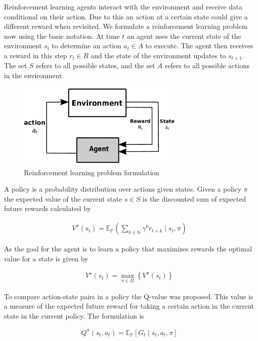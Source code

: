 \documentclass[a4paper]{article}
\begin{document}
Reinforcement learning agents interact with the environment and receive data conditional on their action. Due to this an action at a certain state could give a different reward when revisited. We formulate a reinforcement learning problem now using the basic notation. At time $t$ an agent uses the current state of the environment $s_t$ to determine an action $a_t \in A$ to execute. The agent then receives a reward in this step $r_t \in R$ and the state of the environment updates to $s_{t+1}$. The set $S$ refers to all possible states, and the set $A$ refers to all possible actions in the environment.

\begin{figure}[hbt!]
	\centering
	\includegraphics[width=8cm]{rl_example.png}
	\caption{Reinforcement learning problem formulation}
\end{figure}

\FloatBarrier

A policy is a probability distribution over actions given states. Given a policy $\pi$ the expected value of the current state $s \in S$ is the discounted sum of expected future rewards calculated by

\begin{align*}
	V^{\pi}\left(s_{t}\right)=\mathbb{E}_{\mathbb{P}}\left(\sum_{k \in \mathbb{N}} \gamma^{k} r_{t+k} \mid s_{t}, \pi\right)
\end{align*}

As the goal for the agent is to learn a policy that maximizes rewards the optimal value for a state is given by

\begin{align*}
	V^{\star}\left(s_{t}\right)=\max _{\pi \in \Pi}\left\{V^{\pi}\left(s_{t}\right)\right\}
\end{align*}

To compare action-state pairs in a policy the Q-value was proposed. This value is a measure of the expected future reward for taking a certain action in the current state in the current policy. The formulation is

\begin{align*}
	Q^{\pi}\left(s_{t}, a_{t}\right)=\mathbb{E}_{\mathbb{P}}\left[G_{t} \mid s_{t}, a_{t}, \pi\right]
\end{align*}
\end{document}
